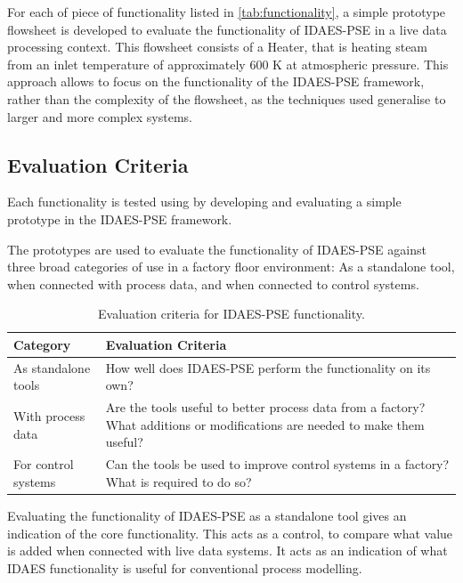 \documentclass[12pt]{article}
\begin{document}
For each of piece of functionality listed in \cref{tab:functionality}, a simple prototype flowsheet is developed to evaluate the functionality of IDAES-PSE in a live data processing context. This flowsheet consists of a Heater, that is heating steam from an inlet temperature of approximately 600 K at atmospheric pressure. This approach allows to focus on the functionality of the IDAES-PSE framework, rather than the complexity of the flowsheet, as the techniques used generalise to larger and more complex systems.


\subsection{Evaluation Criteria}

Each functionality is tested using by developing and evaluating a simple prototype in the IDAES-PSE framework. 

The prototypes are used to evaluate the functionality of IDAES-PSE against three broad categories of use in a factory floor environment: As a standalone tool, when connected with process data, and when connected to control systems. 

\begin{table}[h]
    \centering
    \begin{tabular}{|l|p{10cm}|}
        \hline
        \textbf{Category} & \textbf{Evaluation Criteria} \\
        \hline
        As standalone tools & How well does IDAES-PSE perform the functionality on its own? \\
        \hline
        With process data & Are the tools useful to better process data from a factory? What additions or modifications are needed to make them useful? \\
        \hline
        For control systems & Can the tools be used to improve control systems in a factory? What  is required to do so? \\
        \hline
    \end{tabular}
    \caption{Evaluation criteria for IDAES-PSE functionality.}
    \label{tab:evaluation_criteria}
\end{table}

Evaluating the functionality of IDAES-PSE as a standalone tool gives an indication of the core functionality. This acts as a control, to compare what value is added when connected with live data systems. It acts as an indication of what IDAES functionality is useful for conventional process modelling.
\end{document}
